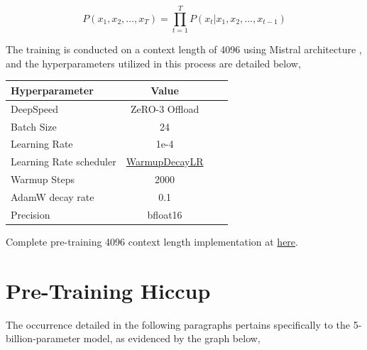 \documentclass{article}
\begin{document}
\[
  P(x_1, x_2, \ldots, x_T) = \prod_{t=1}^{T} P(x_t | x_1, x_2, \ldots, x_{t-1})
\]

\pagebreak

The training is conducted on a context length of 4096 using Mistral architecture \cite{jiang2023mistral}, and the hyperparameters utilized in this process are detailed below,

\begin{table}[h]
  \centering
  \begin{tabular}{lccl}
    \hline
    \textbf{Hyperparameter} & \textbf{Value}                                                                                 \\
    \hline
    DeepSpeed               & ZeRO-3 Offload                                                                                 \\
    Batch Size              & 24                                                                                             \\
    Learning Rate           & 1e-4                                                                                           \\
    Learning Rate scheduler & \href{https://deepspeed.readthedocs.io/en/latest/schedulers.html#warmupdecaylr}{WarmupDecayLR} \\
    Warmup Steps            & 2000                                                                                           \\
    AdamW decay rate        & 0.1                                                                                            \\
    Precision               & bfloat16                                                                                       \\
    \hline
  \end{tabular}
\end{table}

Complete pre-training 4096 context length implementation at \href{https://github.com/mesolitica/malaya/wiki/MaLLaM-%F0%9F%8C%99-Malaysia-Large-Language-Model#training-scripts-and-sessions}{here}.

\section{Pre-Training Hiccup}

The occurrence detailed in the following paragraphs pertains specifically to the 5-billion-parameter model, as evidenced by the graph below,
\end{document}
